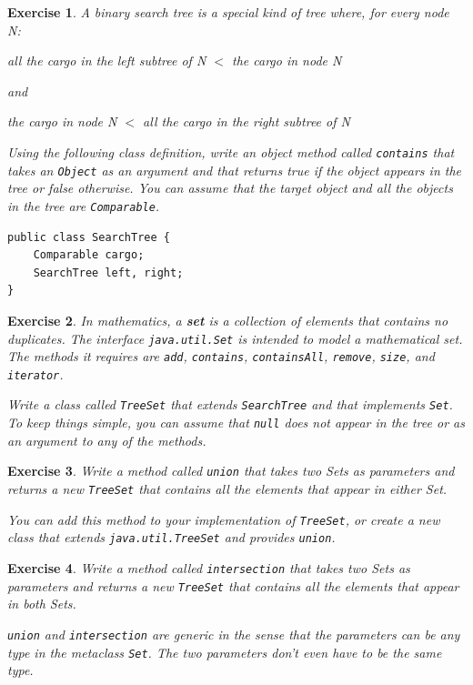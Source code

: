 \documentclass[12pt]{book}
\theoremstyle{exercise}
\newtheorem{exercise}{Exercise}[chapter]
\begin{document}
\begin{exercise}
\label{ex.searchtree}
A binary search tree is a special kind of tree where,
for every node N:

\vspace{0.1in}
all the cargo in the left subtree of N $<$ the cargo in node N

and

the cargo in node N $<$ all the cargo in the right subtree of N
\vspace{0.1in}

Using the following class definition, write an object method called
{\tt contains} that takes an {\tt Object} as an argument and that
returns true if the object appears in the tree or false otherwise.
You can assume that the target object and all the objects in the
tree are {\tt Comparable}.

\begin{verbatim}
public class SearchTree {
    Comparable cargo;
    SearchTree left, right;
}
\end{verbatim}
\end{exercise}


\begin{exercise}
\label{ex.treeset}
In mathematics, a {\bf set} is a collection of elements that
contains no duplicates.
The interface {\tt java.util.Set} is intended to model a mathematical
set.  The methods it requires are {\tt add}, {\tt contains},
{\tt containsAll}, {\tt remove}, {\tt size}, and {\tt iterator}.

Write a class called {\tt TreeSet} that extends {\tt SearchTree}
and that implements {\tt Set}.  
To keep things simple, you can assume that {\tt null} does
not appear in the tree or as an argument to any of the methods.
\end{exercise}


\begin{exercise}
Write a method called {\tt union} that takes two Sets as
parameters and returns a new {\tt TreeSet} that contains all
the elements that appear in either Set.

You can add this method to your implementation of {\tt TreeSet},
or create a new class that extends {\tt java.util.TreeSet} and
provides {\tt union}.
\end{exercise}

\begin{exercise}
Write a method called {\tt intersection} that takes two Sets as
parameters and returns a new {\tt TreeSet} that contains all
the elements that appear in both Sets.

{\tt union} and {\tt intersection} are generic in the sense that
the parameters can be any type in the metaclass {\tt Set}.  The
two parameters don't even have to be the same type.
\end{exercise}
\end{document}
